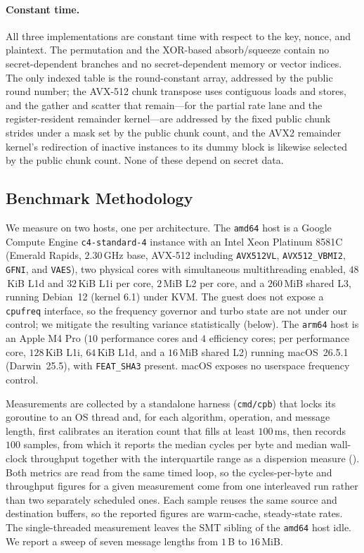 \paragraph{Constant time.}
All three implementations are constant time with respect to the key, nonce, and
plaintext. The permutation and the XOR-based absorb/squeeze contain no
secret-dependent branches and no secret-dependent memory or vector indices. The
only indexed table is the round-constant array, addressed by the public round
number; the AVX-512 chunk transpose uses contiguous loads and stores, and the
gather and scatter that remain---for the partial rate lane and the
register-resident remainder kernel---are addressed by the fixed public chunk
strides under a mask set by the public chunk count, and the AVX2 remainder
kernel's redirection of inactive instances to its dummy block is likewise
selected by the public chunk count. None of these depend on secret data.

\subsection{Benchmark Methodology}
\label{sec:bench-method}

We measure on two hosts, one per architecture. The \texttt{amd64} host is a
Google Compute Engine \texttt{c4-standard-4} instance with an Intel Xeon Platinum
8581C (Emerald Rapids, $2.30$\,GHz base, AVX-512 including \texttt{AVX512VL},
\texttt{AVX512\_VBMI2}, \texttt{GFNI}, and \texttt{VAES}), two physical cores
with simultaneous multithreading enabled, $48$\,KiB L1d and $32$\,KiB L1i per
core, $2$\,MiB L2 per core, and a $260$\,MiB shared L3, running Debian~12 (kernel
6.1) under KVM. The guest does not expose a \texttt{cpufreq} interface, so the
frequency governor and turbo state are not under our control; we mitigate the
resulting variance statistically (below). The \texttt{arm64} host is an Apple M4
Pro ($10$ performance cores and $4$ efficiency cores; per performance core,
$128$\,KiB L1i, $64$\,KiB L1d, and a $16$\,MiB shared L2) running macOS~26.5.1
(Darwin~25.5), with \texttt{FEAT\_SHA3} present. macOS exposes no userspace
frequency control.

Measurements are collected by a standalone harness (\texttt{cmd/cpb}) that locks
its goroutine to an OS thread and, for each algorithm, operation, and message
length, first calibrates an iteration count that fills at least $100$\,ms, then
records $100$ samples, from which it reports the median cycles per byte and
median wall-clock throughput together with the interquartile range as a
dispersion measure (). Both metrics are read from the same timed loop, so the
cycles-per-byte and throughput figures for a given measurement come from one
interleaved run rather than two separately scheduled ones. Each sample reuses the
same source and destination buffers, so the reported figures are warm-cache,
steady-state rates. The single-threaded measurement leaves the SMT sibling of the
\texttt{amd64} host idle. We report a sweep of seven message lengths from $1$\,B
to $16$\,MiB.

